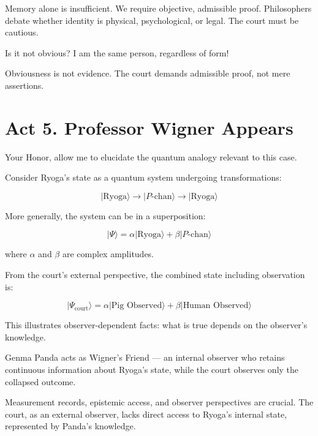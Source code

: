\documentclass[12pt]{article}
\begin{document}
\begin{tcolorbox}[title=Defense Counsel:]
Memory alone is insufficient. We require objective, admissible proof. Philosophers debate whether identity is physical, psychological, or legal. The court must be cautious.
\end{tcolorbox}

\begin{tcolorbox}[title=Ryoga (frustrated):]
Is it not obvious? I am the same person, regardless of form!
\end{tcolorbox}

\begin{tcolorbox}[title=Defense Counsel:]
Obviousness is not evidence. The court demands admissible proof, not mere assertions.
\end{tcolorbox}

\section*{Act 5. Professor Wigner Appears}

\begin{tcolorbox}[title=Professor Wigner:]
Your Honor, allow me to elucidate the quantum analogy relevant to this case.

Consider Ryoga’s state as a quantum system undergoing transformations:

\[
|\text{Ryoga}\rangle
\rightarrow
|P\text{-chan}\rangle
\rightarrow
|\text{Ryoga}\rangle
\]

More generally, the system can be in a superposition:

\[
|\Psi\rangle
=
\alpha|\text{Ryoga}\rangle
+
\beta|P\text{-chan}\rangle
\]

where \(\alpha\) and \(\beta\) are complex amplitudes.

From the court’s external perspective, the combined state including observation is:

\[
|\Psi_{\text{court}}\rangle
=
\alpha|\text{Pig Observed}\rangle
+
\beta|\text{Human Observed}\rangle
\]

This illustrates observer-dependent facts: what is true depends on the observer’s knowledge.

Genma Panda acts as Wigner’s Friend — an internal observer who retains continuous information about Ryoga’s state, while the court observes only the collapsed outcome.

Measurement records, epistemic access, and observer perspectives are crucial. The court, as an external observer, lacks direct access to Ryoga’s internal state, represented by Panda’s knowledge.
\end{tcolorbox}
\end{document}
